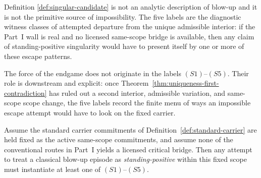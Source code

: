 Definition \ref{def:singular-candidate} is not an analytic description of blow-up and it is not the primitive source of impossibility. The five labels are the diagnostic witness classes of attempted departure from the unique admissible interior: if the Part~I wall is real and no licensed same-scope bridge is available, then any claim of standing-positive singularity would have to present itself by one or more of these escape patterns.

\begin{remark}
The force of the endgame does not originate in the labels $(S1)$--$(S5)$. Their role is downstream and explicit: once Theorem~\ref{thm:uniqueness-first-contradiction} has ruled out a second interior, admissible variation, and same-scope scope change, the five labels record the finite menu of ways an impossible escape attempt would have to look on the fixed carrier.
\end{remark}

\begin{lemma}\label{lem:part1-to-singular}
Assume the standard carrier commitments of Definition~\ref{def:standard-carrier} are held fixed as the
active same-scope commitments, and assume none of the conventional routes in Part~I yields a licensed
critical bridge.
Then any attempt to treat a classical blow-up episode as \emph{standing-positive} within this fixed scope
must instantiate at least one of $(S1)$--$(S5)$.
\end{lemma}

